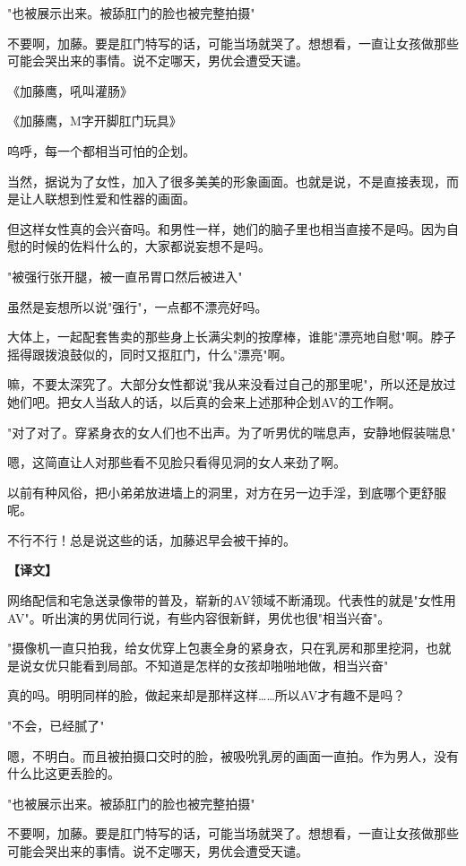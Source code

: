 \documentclass[12pt,UTF8]{ctexbook}
\begin{document}
{{"也被展示出来。被舔肛门的脸也被完整拍摄"

不要啊，加藤。要是肛门特写的话，可能当场就哭了。想想看，一直让女孩做那些可能会哭出来的事情。说不定哪天，男优会遭受天谴。

《加藤鹰，吼叫灌肠》

《加藤鹰，M字开脚肛门玩具》

呜呼，每一个都相当可怕的企划。

当然，据说为了女性，加入了很多美美的形象画面。也就是说，不是直接表现，而是让人联想到性爱和性器的画面。

但这样女性真的会兴奋吗。和男性一样，她们的脑子里也相当直接不是吗。因为自慰的时候的佐料什么的，大家都说妄想不是吗。

"被强行张开腿，被一直吊胃口然后被进入"

虽然是妄想所以说"强行"，一点都不漂亮好吗。

大体上，一起配套售卖的那些身上长满尖刺的按摩棒，谁能"漂亮地自慰"啊。脖子摇得跟拨浪鼓似的，同时又抠肛门，什么"漂亮"啊。

嘛，不要太深究了。大部分女性都说"我从来没看过自己的那里呢"，所以还是放过她们吧。把女人当敌人的话，以后真的会来上述那种企划AV的工作啊。

"对了对了。穿紧身衣的女人们也不出声。为了听男优的喘息声，安静地假装喘息"

嗯，这简直让人对那些看不见脸只看得见洞的女人来劲了啊。

以前有种风俗，把小弟弟放进墙上的洞里，对方在另一边手淫，到底哪个更舒服呢。

不行不行！总是说这些的话，加藤迟早会被干掉的。
}

\vspace{2ex}
\parbox{0.9\linewidth}{
\textbf{【译文】}\par

网络配信和宅急送录像带的普及，崭新的AV领域不断涌现。代表性的就是"女性用AV"。听出演的男优同行说，有些内容很新鲜，男优也很"相当兴奋"。

"摄像机一直只拍我，给女优穿上包裹全身的紧身衣，只在乳房和那里挖洞，也就是说女优只能看到局部。不知道是怎样的女孩却啪啪地做，相当兴奋"

真的吗。明明同样的脸，做起来却是那样这样……所以AV才有趣不是吗？

"不会，已经腻了"

嗯，不明白。而且被拍摄口交时的脸，被吸吮乳房的画面一直拍。作为男人，没有什么比这更丢脸的。

"也被展示出来。被舔肛门的脸也被完整拍摄"

不要啊，加藤。要是肛门特写的话，可能当场就哭了。想想看，一直让女孩做那些可能会哭出来的事情。说不定哪天，男优会遭受天谴。

}}
\end{document}
